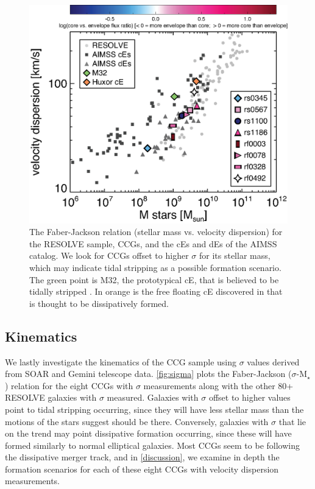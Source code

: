 \documentclass[iop,apj]{emulateapj}
\begin{document}
 \begin{figure}[b]
\begin{center}
\includegraphics{faber-jackson_resolvesigmas.eps}
\caption{The Faber-Jackson relation (stellar mass vs. velocity dispersion) for the RESOLVE sample, CCGs, and the cEs and dEs of the AIMSS catalog. We look for CCGs offset to higher $\sigma$ for its stellar mass, which may indicate tidal stripping as a possible formation scenario. The green point is M32, the prototypical cE, that is believed to be tidally stripped \citep{Faber1973}. In orange is the free floating cE discovered in \citet{Huxor2013} that is thought to be dissipatively formed.}
\label{fig:sigma}
\end{center}
\end{figure}
 
\subsection{Kinematics}
\label{kin}
 We lastly investigate the kinematics of the CCG sample using $\sigma$ values derived from SOAR and Gemini telescope data. \autoref{fig:sigma} plots the Faber-Jackson ($\sigma$-M$_{\star}$) relation for the eight CCGs with $\sigma$ measurements along with the other 80+ RESOLVE galaxies with $\sigma$ measured. Galaxies with $\sigma$ offset to higher values point to tidal stripping occurring, since they will have less stellar mass than the motions of the stars suggest should be there. Conversely, galaxies with $\sigma$ that lie on the trend may point dissipative formation occurring, since these will have formed similarly to normal elliptical galaxies. Most CCGs seem to be following the dissipative merger track, and in \autoref{discussion}, we examine in depth the formation scenarios for each of these eight CCGs with velocity dispersion measurements.
\end{document}
